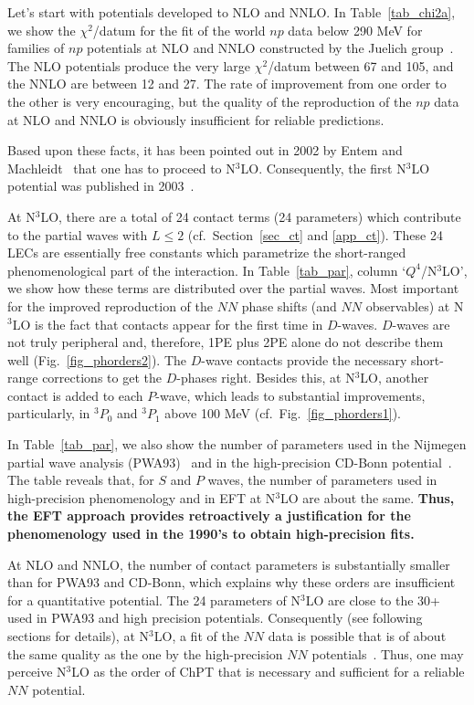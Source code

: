 \documentclass[sort&compress,preprint,3p]{elsarticle}
\begin{document}
Let's start with potentials developed to NLO and NNLO.
In Table~\ref{tab_chi2a}, we show
the $\chi^2$/datum for the fit of the world $np$ data
below 290 MeV for families of $np$ potentials at 
NLO and NNLO constructed by the Juelich group~\cite{EGM04}.
The NLO potentials produce the very large $\chi^2$/datum between 67 and 105,
and the NNLO are between 12 and 27.
The rate of improvement from one order to the other
is very encouraging, but the quality of the reproduction
of the $np$ data at NLO and NNLO is obviously
insufficient for reliable predictions.

Based upon these facts, it has been pointed out in 2002 by
Entem and Machleidt~\cite{EM02a,EM02} that one has
to proceed to N$^3$LO. Consequently, the first N$^3$LO  potential was
published in 2003~\cite{EM03}. 


At N$^3$LO, there are a total of 24 contact terms (24 parameters)
which contribute to the partial waves with $L\leq 2$ 
(cf.~Section~\ref{sec_ct} and \ref{app_ct}).
These 24 LECs are essentially free constants
which parametrize
the short-ranged phenomenological part of the interaction.
In Table~\ref{tab_par}, column `$Q^4$/N$^3$LO', we show how these
terms are distributed over the partial waves.
Most important for the improved reproduction of the $NN$ 
phase shifts (and $NN$ observables) 
at N$^3$LO is the fact that 
contacts appear for the first time in $D$-waves. 
$D$-waves are not truly peripheral and, therefore,
1PE plus 2PE alone do not describe them well (Fig.~\ref{fig_phorders2}).
The $D$-wave contacts provide the necessary 
short-range corrections to get the $D$-phases right.
Besides this, at N$^3$LO, another contact is added to each
$P$-wave, which leads to substantial improvements,
particularly, in $^3P_0$ and $^3P_1$ above 100 MeV
(cf.\ Fig.~\ref{fig_phorders1}).



In Table~\ref{tab_par},
we also show the number of parameters
used in the Nijmegen partial wave analysis (PWA93)~\cite{Sto93}
and in the high-precision CD-Bonn potential~\cite{Mac01}.
The table reveals that, for $S$ and $P$ waves, 
the number of parameters
used in high-precision phenomenology and in EFT at N$^3$LO
are about the same.
{\bf Thus, the EFT approach provides retroactively a justification
for the phenomenology used in the 1990's to  obtain high-precision fits.}

At NLO and NNLO, the number of contact parameters is substantially
smaller than for PWA93 and CD-Bonn, which explains why
these orders are insufficient for a quantitative potential.
The 24 parameters of N$^3$LO are close to the 30+
used in PWA93 and high precision potentials. Consequently
(see following sections for details), at N$^3$LO,
a fit of the $NN$ data is possible
that is of about the
same quality as the one by the high-precision $NN$ 
potentials~\cite{Sto94,WSS95,MSS96,Mac01}.
Thus, one may perceive N$^3$LO as the order of ChPT that
is necessary and sufficient for a reliable $NN$ potential.
\end{document}
